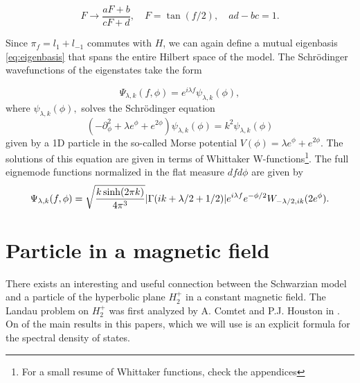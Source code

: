 \begin{equation}
F\rightarrow\frac{aF+b}{cF+d},\quad F= \tan(f/2),\quad ad-bc = 1.
\end{equation}

Since $\pi_f = l_1 + l_{-1}$ commutes with $H$, we can again define a mutual eigenbasis \eqref{eq:eigenbasis} that spans the entire Hilbert space of the model. The Schrödinger wavefunctions of the eigenstates take the form

\begin{equation}
\Psi_{\lambda,k}(f,\phi) = e^{i\lambda f}\psi_{\lambda,k}(\phi), 
\end{equation}
where $\psi_{\lambda,k}(\phi), $ solves the Schrödinger equation
\begin{equation}
(-\partial^2_\phi + \lambda e^\phi + e^{2\phi})\psi_{\lambda,k}(\phi) = k^2 \psi_{\lambda,k}(\phi)
\end{equation}
given by a 1D particle in the so-called Morse potential $V(\phi)= \lambda e^\phi + e^{2\phi}$. The solutions of this equation are given in terms of Whittaker W-functions\footnote{For a small resume of Whittaker functions, check the appendices}. The full eignemode functions normalized in the flat measure $df d\phi$ are given by
\begin{equation}
\Psi_{\lambda,k}(f,\phi) = \sqrt{\frac{k\sinh(2\pi k)}{4\pi^3}}\abs{\Gamma(ik+\lambda/2 + 1/2)}e^{i\lambda f}e^{-\phi/2}W_{-\lambda/2,ik}(2e^\phi).
\label{eq:eigenfunctiosn}
\end{equation}
\section{Particle in a magnetic field}
There exists an interesting and useful connection between the Schwarzian model and a particle of the hyperbolic plane $H^+_2$ in a constant magnetic field\cite{Kitaev16}. The Landau problem on $H^+_2$ was first analyzed by A. Comtet and P.J. Houston in \cite{ComtetHouston85,Comtet85}. On of the main results in this papers, which we will use is an explicit formula for the spectral density of states.

